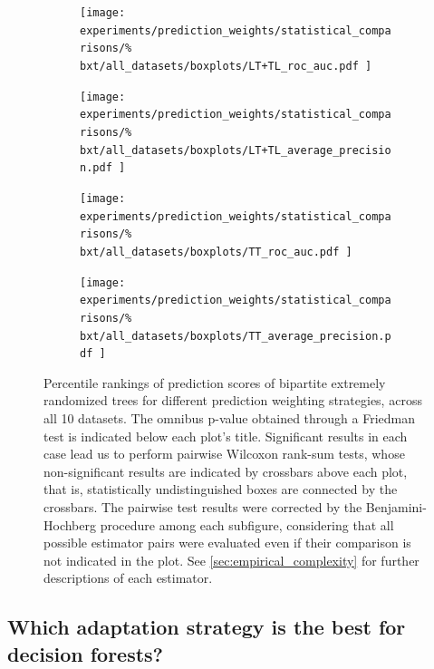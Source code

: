\begin{figure}[tbh]
    \centering
    \begin{subfigure}{0.49\textwidth}
        \texttt{[image: 
            experiments/prediction\_weights/statistical\_comparisons/\%
            bxt/all\_datasets/boxplots/LT+TL\_roc\_auc.pdf
        ]}
    \end{subfigure}
    \begin{subfigure}{0.49\textwidth}
        \texttt{[image: 
            experiments/prediction\_weights/statistical\_comparisons/\%
            bxt/all\_datasets/boxplots/LT+TL\_average\_precision.pdf
        ]}
    \end{subfigure}

    \begin{subfigure}{0.49\textwidth}
        \texttt{[image: 
            experiments/prediction\_weights/statistical\_comparisons/\%
            bxt/all\_datasets/boxplots/TT\_roc\_auc.pdf
        ]}
    \end{subfigure}
    \begin{subfigure}{0.49\textwidth}
        \texttt{[image: 
            experiments/prediction\_weights/statistical\_comparisons/\%
            bxt/all\_datasets/boxplots/TT\_average\_precision.pdf
        ]}
    \end{subfigure}
    \caption{
        Percentile rankings of prediction scores of bipartite extremely randomized trees for different prediction weighting strategies, across all 10 datasets.
        The omnibus p-value obtained through a Friedman test is indicated below each plot's title. Significant results in each case lead us to perform pairwise Wilcoxon rank-sum tests, whose non-significant results are indicated by crossbars above each plot, that is, statistically undistinguished boxes are connected by the crossbars. The pairwise test results were corrected by the Benjamini-Hochberg procedure among each subfigure, considering that all possible estimator pairs were evaluated even if their comparison is not indicated in the plot. See \autoref{sec:empirical_complexity} for further descriptions of each estimator.
    }
    \label{fig:pred_weights_bxt}
\end{figure}



\subsection{Which adaptation strategy is the best for decision forests?}
\label{sec:adaptation_comparison}

